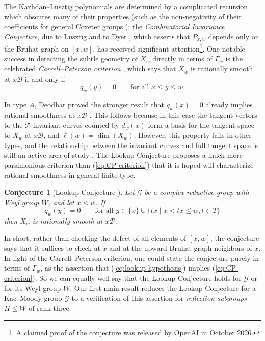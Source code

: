 \documentclass[11pt]{amsart}
\newtheorem{conjecture}[conjecture]{Conjecture}
\theoremstyle{definition}
\theoremstyle{remark}
\numberwithin{equation}{section}
\begin{document}
The Kazhdan--Lusztig polynomials are determined by a complicated recursion which obscures many of their properties (such as the non-negativity of their coefficients for general Coxeter groups \cite{Elias-Williamson}); the \emph{Combinatorial Invariance Conjecture}, due to Lusztig and to Dyer \cite{DyerThesis}, which asserts that $P_{x,w}$ depends only on the Bruhat graph on $[x,w]$, has received significant attention\footnote{A claimed proof of the conjecture was released by OpenAI in October 2026.}. One notable success in detecting the subtle geometry of $X_w$ directly in terms of $\Gamma_w$ is the celebrated \emph{Carrell--Peterson criterion} \cite{Carrell,Kumar}, which says that $X_w$ is rationally smooth at $x\mathcal{B}$ if and only if
\begin{equation}
\label{eq:CP-criterion}
q_w(y)=0 \qquad \text{for all $x \leq y \leq w$.}
\end{equation}

In type $A$, Deodhar proved the stronger result that $q_w(x)=0$ already implies rational smoothness at $x\mathcal{B}$ \cite{Deodhar}. This follows because in this case the tangent vectors to the $\mathcal{T}$-invariant curves counted by $d_w(x)$ form a basis for the tangent space to $X_w$ at $x\mathcal{B}$, and $\ell(w)=\dim(X_w)$. However, this property fails in other types, and the relationship between the invariant curves and full tangent space is still an active area of study \cite{Carrell-Kuttler-1, Carrell-Kuttler-2,Graham-Kreiman,Kisin-Pappas-Zhou}. The Lookup Conjecture proposes a much more parsimonious criterion than (\ref{eq:CP-criterion}) that it is hoped will characterize rational smoothness in general finite type.

\begin{conjecture}[Lookup Conjecture \cite{BG}]
\label{conj:lookup}
Let $\mathcal{G}$ be a complex reductive group with Weyl group $W$, and let $x \leq w$. If 
\begin{equation}
\label{eq:lookup-hypothesis}
q_w(y)=0 \qquad \text{for all $y \in \{x\} \cup \{tx \mid x<tx \leq w, t \in T\}$}
\end{equation}
then $X_w$ is rationally smooth at $x\mathcal{B}$.
\end{conjecture}

In short, rather than checking the defect of all elements of $[x,w]$, the conjecture says that it suffices to check at $x$ and at the upward Bruhat graph neighbors of $x$. In light of the Carrell--Peterson criterion, one could state the conjecture purely in terms of $\Gamma_w$, as the assertion that (\ref{eq:lookup-hypothesis}) implies (\ref{eq:CP-criterion}). So we can equally well say that the Lookup Conjecture holds for $\mathcal{G}$ or for its Weyl group $W$. Our first main result reduces the Lookup Conjecture for a Kac--Moody group $\mathcal{G}$ to a verification of this assertion for \emph{reflection subgroups} $H \leq W$ of rank three. 
\end{document}
